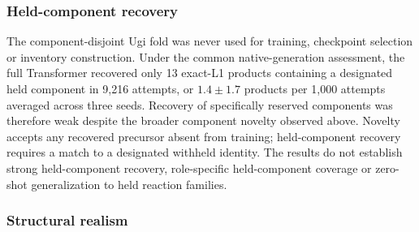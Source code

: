 \documentclass{article}
\theoremstyle{definition}
\newcommand{\ForgeProseCommonForgeHeldPerThousand}{$1.4\pm1.7$}
\newcommand{\ForgeProseCommonHeldAttempts}{9{,}216}
\newcommand{\ForgeProseCommonHeldTotal}{13}
\begin{document}
\subsubsection{Held-component recovery}

The component-disjoint Ugi fold was never used for training, checkpoint selection or inventory
construction. Under the common native-generation assessment, the full Transformer recovered only
\ForgeProseCommonHeldTotal{} exact-L1 products containing a designated held component in
\ForgeProseCommonHeldAttempts{} attempts, or \ForgeProseCommonForgeHeldPerThousand{} products per 1,000
attempts averaged across three seeds. Recovery of specifically reserved components was therefore weak despite the broader component
novelty observed above. Novelty accepts any recovered precursor absent from training; held-component
recovery requires a match to a designated withheld identity. The results do not establish strong
held-component recovery, role-specific held-component coverage or zero-shot generalization to
held reaction families.

\subsubsection{Structural realism}
\end{document}
